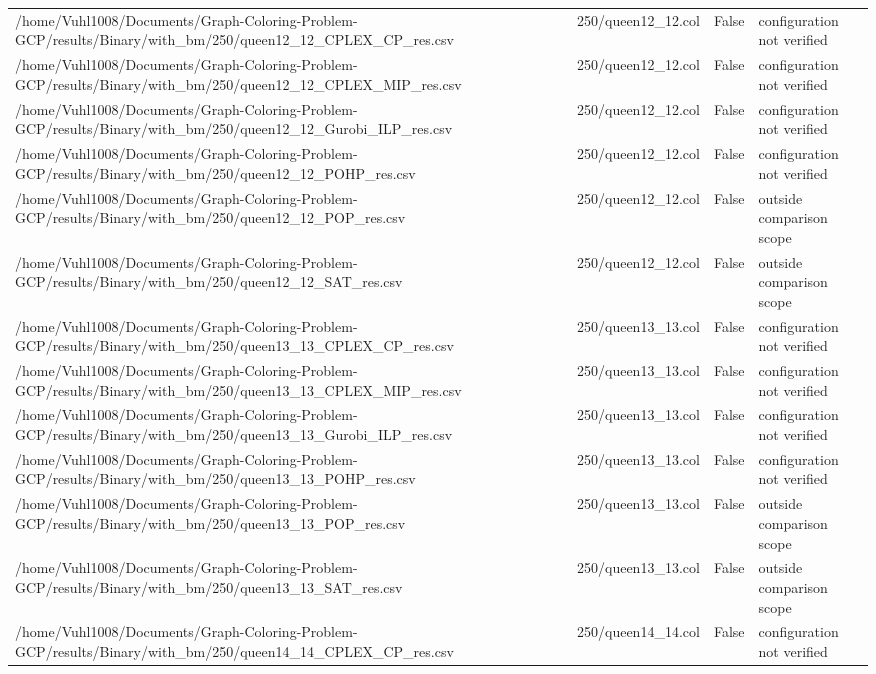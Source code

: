 \begin{table}[htbp]
\begin{tabular}{llll}
/home/Vuhl1008/Documents/Graph-Coloring-Problem-GCP/results/Binary/with\_bm/250/queen12\_12\_CPLEX\_CP\_res.csv & 250/queen12\_12.col & False & configuration not verified \\
/home/Vuhl1008/Documents/Graph-Coloring-Problem-GCP/results/Binary/with\_bm/250/queen12\_12\_CPLEX\_MIP\_res.csv & 250/queen12\_12.col & False & configuration not verified \\
/home/Vuhl1008/Documents/Graph-Coloring-Problem-GCP/results/Binary/with\_bm/250/queen12\_12\_Gurobi\_ILP\_res.csv & 250/queen12\_12.col & False & configuration not verified \\
/home/Vuhl1008/Documents/Graph-Coloring-Problem-GCP/results/Binary/with\_bm/250/queen12\_12\_POHP\_res.csv & 250/queen12\_12.col & False & configuration not verified \\
/home/Vuhl1008/Documents/Graph-Coloring-Problem-GCP/results/Binary/with\_bm/250/queen12\_12\_POP\_res.csv & 250/queen12\_12.col & False & outside comparison scope \\
/home/Vuhl1008/Documents/Graph-Coloring-Problem-GCP/results/Binary/with\_bm/250/queen12\_12\_SAT\_res.csv & 250/queen12\_12.col & False & outside comparison scope \\
/home/Vuhl1008/Documents/Graph-Coloring-Problem-GCP/results/Binary/with\_bm/250/queen13\_13\_CPLEX\_CP\_res.csv & 250/queen13\_13.col & False & configuration not verified \\
/home/Vuhl1008/Documents/Graph-Coloring-Problem-GCP/results/Binary/with\_bm/250/queen13\_13\_CPLEX\_MIP\_res.csv & 250/queen13\_13.col & False & configuration not verified \\
/home/Vuhl1008/Documents/Graph-Coloring-Problem-GCP/results/Binary/with\_bm/250/queen13\_13\_Gurobi\_ILP\_res.csv & 250/queen13\_13.col & False & configuration not verified \\
/home/Vuhl1008/Documents/Graph-Coloring-Problem-GCP/results/Binary/with\_bm/250/queen13\_13\_POHP\_res.csv & 250/queen13\_13.col & False & configuration not verified \\
/home/Vuhl1008/Documents/Graph-Coloring-Problem-GCP/results/Binary/with\_bm/250/queen13\_13\_POP\_res.csv & 250/queen13\_13.col & False & outside comparison scope \\
/home/Vuhl1008/Documents/Graph-Coloring-Problem-GCP/results/Binary/with\_bm/250/queen13\_13\_SAT\_res.csv & 250/queen13\_13.col & False & outside comparison scope \\
/home/Vuhl1008/Documents/Graph-Coloring-Problem-GCP/results/Binary/with\_bm/250/queen14\_14\_CPLEX\_CP\_res.csv & 250/queen14\_14.col & False & configuration not verified \\

\end{tabular}
\end{table}

